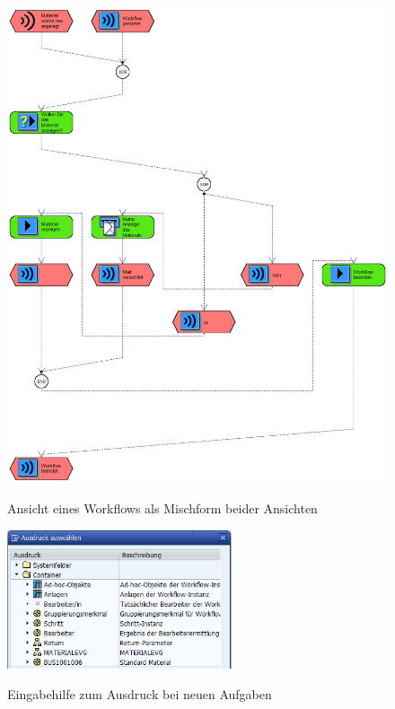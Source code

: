\begin{figure}[H]
	\begin{center}
	\includegraphics[width=1.0\textwidth]{grafiken/wf-builder_view-epc.png}
	\caption{Ansicht eines Workflows als Mischform beider Ansichten}
	\vspace{-10pt}
	\label{abb:workflow-view-epc}
	\end{center}
\end{figure}

\begin{figure}[H]
	\begin{center}
	\includegraphics[width=250px]{grafiken/wf-builder_bsp1_formular-aufgabe_eingabehilfe-ausdruck.png}
	\caption{Eingabehilfe zum Ausdruck bei neuen Aufgaben}
	\vspace{-10pt}
	\label{abb:workflow-bsp1-aufgaben_form-inputhelp}
	\end{center}
\end{figure}

